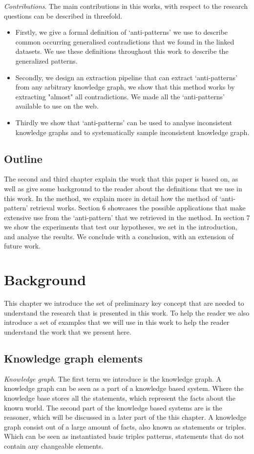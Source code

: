 \documentclass{article}
\begin{document}
\textit{Contributions}. 
The main contributions in this works, with respect to the research questions can be described in threefold.
\begin{itemize}
	\item Firstly, we give a formal definition of `anti-patterns' we use to describe common occurring generalised contradictions that we found in the linked datasets. We use these definitions throughout this work to describe the generalized patterns.
	\item Secondly, we design an extraction pipeline that can extract `anti-patterns' from any arbitrary knowledge graph, we show that this method works by extracting "almost" all contradictions. We made all the `anti-patterns' available to use on the web.
	\item Thirdly we show that `anti-patterns' can be used to analyse inconsistent knowledge graphs and to systematically sample inconsistent knowledge graph.
\end{itemize}

\subsection{Outline}
 The second and third chapter explain the work that this paper is based on, as well as give some background to the reader about the definitions that we use in this work. In the method, we explain more in detail how the method of `anti-pattern' retrieval works. Section 6  showcases the possible applications that make extensive use from the `anti-pattern' that we retrieved in the method. In section 7 we show the experiments that test our hypotheses, we set in the introduction, and analyse the results. We conclude with a conclusion, with an extension of future work.

\newpage
\section{Background}
This chapter we introduce the set of preliminary key concept that are needed to understand the research that is presented in this work. To help the reader we also introduce a set of examples that we will use in this work to help the reader understand the work that we present here.

\subsection{Knowledge graph elements}
\textit{Knowledge graph}. The first term we introduce is the knowledge graph. A knowledge graph can be seen as a part of a knowledge based system. Where the knowledge base stores all the statements, which represent the facts about the known world. The second part of the knowledge based systems are is the reasoner, which will be discussed in a later part of the this chapter. A knowledge graph consist out of a large amount of facts, also known as statements or triples. Which can be seen as instantiated basic triples patterns, statements that do not contain any changeable elements.\\
\end{document}
